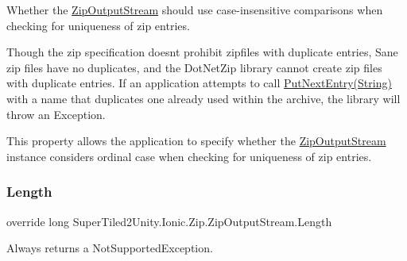 Whether the \mbox{\hyperlink{class_super_tiled2_unity_1_1_ionic_1_1_zip_1_1_zip_output_stream}{Zip\+Output\+Stream}} should use case-\/insensitive comparisons when checking for uniqueness of zip entries. 

Though the zip specification doesn\textquotesingle{}t prohibit zipfiles with duplicate entries, Sane zip files have no duplicates, and the Dot\+Net\+Zip library cannot create zip files with duplicate entries. If an application attempts to call \mbox{\hyperlink{class_super_tiled2_unity_1_1_ionic_1_1_zip_1_1_zip_output_stream_a6328a636a423976167278aca779a3eca}{Put\+Next\+Entry(\+String)}} with a name that duplicates one already used within the archive, the library will throw an Exception. 

This property allows the application to specify whether the \mbox{\hyperlink{class_super_tiled2_unity_1_1_ionic_1_1_zip_1_1_zip_output_stream}{Zip\+Output\+Stream}} instance considers ordinal case when checking for uniqueness of zip entries. \mbox{\label{class_super_tiled2_unity_1_1_ionic_1_1_zip_1_1_zip_output_stream_aca9775b4fa968157ae513542b4ccefbe}} 
\subsubsection{\texorpdfstring{Length}{Length}}
{\footnotesize\ttfamily override long Super\+Tiled2\+Unity.\+Ionic.\+Zip.\+Zip\+Output\+Stream.\+Length\hspace{0.3cm}{\ttfamily [get]}}



Always returns a Not\+Supported\+Exception. 

\mbox{\label{class_super_tiled2_unity_1_1_ionic_1_1_zip_1_1_zip_output_stream_aa1c7d8a2814a63a083a360a9b4b941e7}} 
